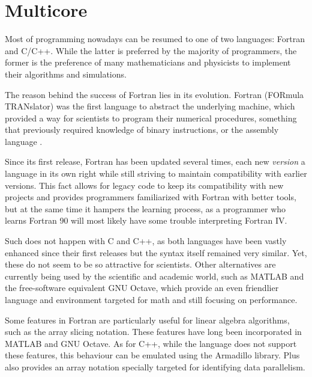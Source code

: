 \documentclass[../thesis]{subfiles}
\begin{document}
	\chapter{Multicore}
	\label{chp:multicore}

	Most of \hpc programming nowadays can be resumed to one of two languages: Fortran and C/C++. While the latter is preferred by the majority of programmers, the former is the preference of many mathematicians and physicists to implement their algorithms and simulations.

	The reason behind the success of Fortran lies in its evolution. Fortran (FORmula TRANslator) was the first language to abstract the underlying machine, which provided a way for scientists to program their numerical procedures, something that previously required knowledge of binary instructions, or the assembly language \cite{IBM100:Fortran}.

	Since its first release, Fortran has been updated several times, each new \textit{version} a language in its own right while still striving to maintain compatibility with earlier versions. This fact allows for legacy code to keep its compatibility with new projects and provides programmers familiarized with Fortran with better tools, but at the same time it hampers the learning process, as a programmer who learns Fortran 90 will most likely have some trouble interpreting Fortran IV.

	Such does not happen with C and C++, as both languages have been vastly enhanced since their first releases but the syntax itself remained very similar. Yet, these do not seem to be so attractive for scientists. Other alternatives are currently being used by the scientific and academic world, such as MATLAB and the free-software equivalent GNU Octave, which provide an even friendlier language and environment targeted for math and still focusing on performance.

	Some features in Fortran are particularly useful for linear algebra algorithms, such as the array slicing notation. These features have long been incorporated in MATLAB and GNU Octave. As for C++, while the language does not support these features, this behaviour can be emulated using the Armadillo library. \intel\cilk Plus also provides an array notation specially targeted for identifying data parallelism.
\end{document}
